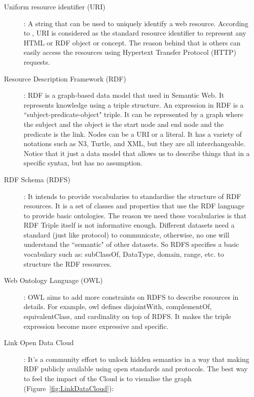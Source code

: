 \begin{description}

\item[Uniform resource identifier (URI)]: A string that can be used to uniquely identify a web resource. According to \cite{berners2006design}, URI is considered as the standard resource identifier to represent any HTML or RDF object or concept. The reason behind that is others can easily access the resources using Hypertext Transfer Protocol (HTTP) requests.

\item[Resource Description Framework (RDF)]: RDF is a graph-based data model that used in Semantic Web. It represents knowledge using a triple structure. An expression in RDF is a ``subject-predicate-object" triple. It can be represented by a graph where the subject and the object is the start node and end node and the predicate is the link. Nodes can be a URI or a literal.  It has a variety of notations such as N3, Turtle, and XML, but they are all interchangeable. Notice that it just a data model that allows us to describe things that in a specific syntax, but has no assumption.

\item[RDF Schema (RDFS)]: It intends to provide vocabularies to standardise the structure of RDF resources. It is a set of classes and properties that use the RDF language to provide basic ontologies. The reason we need these vocabularies is that RDF Triple itself is not informative enough.  Different datasets need a standard (just like protocol) to communicate, otherwise, no one will understand the ``semantic" of other datasets. So RDFS specifies a basic vocabulary such as: subClassOf, DataType, domain, range, etc. to structure the RDF resources.

\item[Web Ontology Language (OWL)]: OWL aims to add more constraints on RDFS to describe resources in details. For example, owl defines disjointWith, complementOf, equivalentClass, and cardinality on top of RDFS. It makes the triple expression become more expressive and specific.

\item[Link Open Data Cloud]: It's a community effort to unlock hidden semantics in a way that making RDF publicly available using open standards and protocols. The best way to feel the impact of the Cloud is to visualise the graph (Figure~\ref{fig:LinkDataCloud}):


\end{description}
